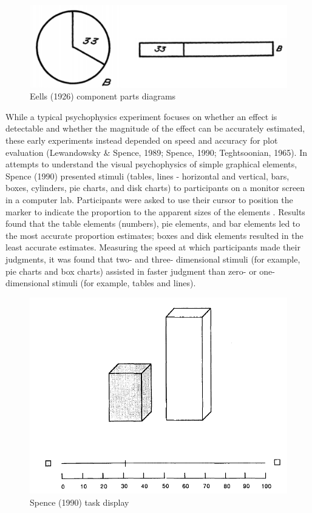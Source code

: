 \documentclass[print]{nuthesis}
\begin{document}
\begin{figure}[tbp]

{\centering \includegraphics[width=0.75\linewidth,]{images/eells-component-parts} 

}

\caption{Eells (1926) component parts diagrams}\label{fig:eells-compoment-parts}
\end{figure}

While a typical psychophysics experiment focuses on whether an effect is detectable and whether the magnitude of the effect can be accurately estimated, these early experiments instead depended on speed and accuracy for plot evaluation (Lewandowsky \& Spence, 1989; Spence, 1990; Teghtsoonian, 1965).
In attempts to understand the visual psychophysics of simple graphical elements, Spence (1990) presented stimuli (tables, lines - horizontal and vertical, bars, boxes, cylinders, pie charts, and disk charts) to participants on a monitor screen in a computer lab.
Participants were asked to use their cursor to position the marker to indicate the proportion to the apparent sizes of the elements .
Results found that the table elements (numbers), pie elements, and bar elements led to the most accurate proportion estimates; boxes and disk elements resulted in the least accurate estimates.
Measuring the speed at which participants made their judgments, it was found that two- and three- dimensional stimuli (for example, pie charts and box charts) assisted in faster judgment than zero- or one- dimensional stimuli (for example, tables and lines).

\begin{figure}[tbp]

{\centering \includegraphics[width=0.75\linewidth,]{images/spence-1990-proportion} 

}

\caption{Spence (1990) task display}\label{fig:spence-1990-proportion}
\end{figure}
\end{document}

